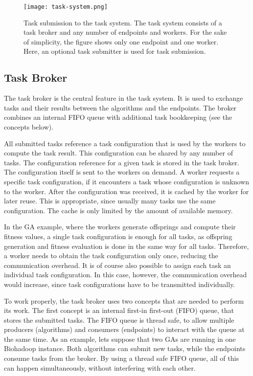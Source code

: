 \begin{figure}
  \centering
  \texttt{[image: task-system.png]}
  \caption[Task submission to the task system]{Task submission to the task system. The task system consists of a task broker and any number of endpoints and workers. For the sake of simplicity, the figure shows only one endpoint and one worker. Here, an optional task submitter is used for task submission.}
  \label{fig:task-system}
\end{figure}

\subsection{Task Broker}
The task broker is the central feature in the task system. It is used to exchange tasks and their results between the algorithms and the endpoints. The broker combines an internal FIFO queue with additional task bookkeeping (see the concepts below).

All submitted tasks reference a task configuration that is used by the workers to compute the task result. This configuration can be shared by any number of tasks. The configuration reference for a given task is stored in the task broker. The configuration itself is sent to the workers on demand. A worker requests a specific task configuration, if it encounters a task whose configuration is unknown to the worker. After the configuration was received, it is cached by the worker for later reuse. This is appropriate, since usually many tasks use the same configuration. The cache is only limited by the amount of available memory.

In the GA example, where the workers generate offsprings and compute their fitness values, a single task configuration is enough for all tasks, as offspring generation and fitness evaluation is done in the same way for all tasks. Therefore, a worker needs to obtain the task configuration only once, reducing the communication overhead. It is of course also possible to assign each task an individual task configuration. In this case, however, the communication overhead would increase, since task configurations have to be transmitted individually.

To work properly, the task broker uses two concepts that are needed to perform its work. The first concept is an internal first-in first-out (FIFO) queue, that stores the submitted tasks. The FIFO queue is thread safe, to allow multiple producers (algorithms) and consumers (endpoints) to interact with the queue at the same time. As an example, lets suppose that two GAs are running in one Biohadoop instance. Both algorithms can submit new tasks, while the endpoints consume tasks from the broker. By using a thread safe FIFO queue, all of this can happen simultaneously, without interfering with each other.

